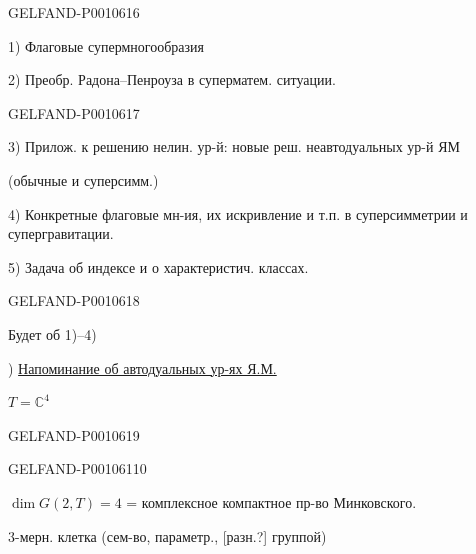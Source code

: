 \begin{GelfandAdjacentEvidence}{GELFAND-P001061}{6}



1) Флаговые супермногообразия

2) Преобр. Радона–Пенроуза в суперматем. ситуации.
\end{GelfandAdjacentEvidence}
\begin{GelfandAdjacentEvidence}{GELFAND-P001061}{7}


3) Прилож. к решению нелин. ур-й: новые реш. неавтодуальных ур-й ЯМ

(обычные и суперсимм.)

4) Конкретные флаговые мн-ия, их искривление и т.п. в суперсимметрии и супергравитации.

5) Задача об индексе и о характеристич. классах.
\end{GelfandAdjacentEvidence}
\begin{GelfandAdjacentEvidence}{GELFAND-P001061}{8}


Будет об 1)–4)

) \underline{Напоминание об автодуальных ур-ях Я.М.}

\(T=\mathbb C^4\)
\end{GelfandAdjacentEvidence}
\begin{GelfandAdjacentEvidence}{GELFAND-P001061}{9}

\end{GelfandAdjacentEvidence}
\begin{GelfandAdjacentEvidence}{GELFAND-P001061}{10}


\(\dim G(2,T)=4\) = комплексное компактное пр-во Минковского.

3-мерн. клетка (сем-во, параметр., [разн.?] группой)
\end{GelfandAdjacentEvidence}

